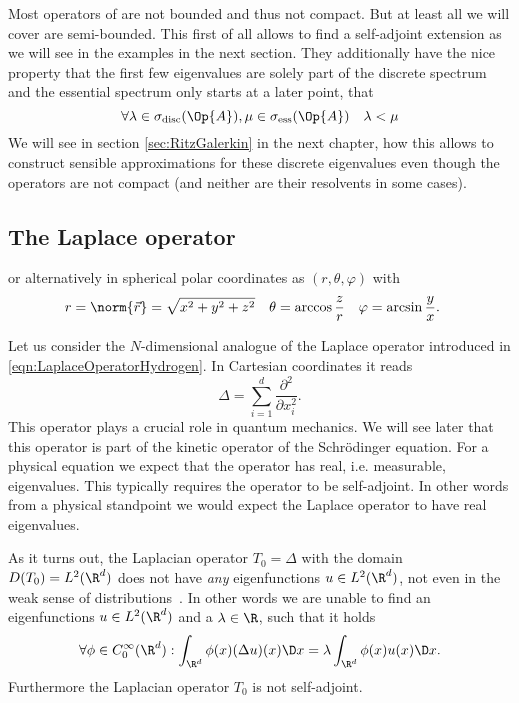 Most operators of \QM are not bounded and thus not compact.
But at least all we will cover are semi-bounded.
This first of all allows to find a self-adjoint extension as we will see in the examples
in the next section.
They additionally have the nice property that the first few eigenvalues are
solely part of the discrete spectrum and the essential spectrum only starts at a
later point, \ie that
\[ \forall \lambda \in \sigma_{\text{disc}}(\Op{A}),
    \mu \in \sigma_{\text{ess}}(\Op{A}) \quad \lambda < \mu \]
We will see in section \vref{sec:RitzGalerkin} in the next chapter,
how this allows to construct sensible approximations
for these discrete eigenvalues even though the operators are not compact
(and neither are their resolvents in some cases).

\subsection{The Laplace operator}


or alternatively in spherical polar coordinates
as $(r, \theta, \varphi)$ with
\begin{align*}
	r &= \norm{\vec{r}} = \sqrt{x^2+y^2+z^2} & \theta &= \arccos\frac{z}{r} & \varphi &= \arcsin\frac{y}{x}.
\end{align*}




\label{sec:SpectrumLaplace}
Let us consider the $N$-dimensional analogue of the Laplace operator
introduced in \eqref{eqn:LaplaceOperatorHydrogen}.
In Cartesian coordinates it reads
\[ \Delta = \sum_{i=1}^d \frac{\partial^2}{\partial x_i^2}. \]
This operator plays a crucial role in quantum mechanics.
We will see later that this operator is part of the
kinetic operator of the Schrödinger equation.
For a physical equation we expect that the operator has
real, i.e. measurable, eigenvalues.
This typically requires the operator to be self-adjoint.
In other words from a physical standpoint we would expect
the Laplace operator to have real eigenvalues.

As it turns out,
the Laplacian operator $T_0 = \Delta$ with the domain $D(T_0) = L^2(\R^d)$
does not have \emph{any}
eigenfunctions $u \in L^2(\R^d)$,
not even in the weak sense of distributions~\cite{Helffer2013}.
In other words we are unable to find an eigenfunctions $u \in L^2(\R^d)$
and a $\lambda \in \R$,
such that it holds
\[ \forall \phi \in C^\infty_0(\R^d):  \int_{\R^d}\phi(x) (\Delta u)(x) \D x = \lambda \int_{\R^d} \phi(x) u(x) \D x. \]
Furthermore the Laplacian operator $T_0$ is not self-adjoint.

